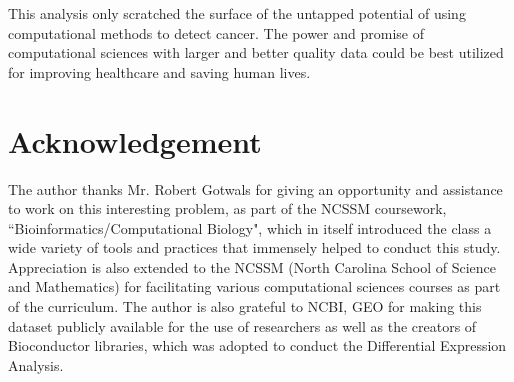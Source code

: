 \documentclass{bioinfo}
\begin{document}
This analysis only scratched the surface of the untapped potential of using computational methods to detect cancer.  The power  and  promise  of  computational  sciences  with  larger  and  better  quality  data  could  be best utilized for improving healthcare and saving human lives.




\section*{Acknowledgement}
The author thanks Mr. Robert Gotwals for giving an opportunity and assistance to work on this interesting problem, as part of the NCSSM coursework, “Bioinformatics/Computational Biology", which in itself introduced the class a wide variety of tools and practices that immensely helped to conduct this study.  Appreciation is also extended to the NCSSM (North Carolina School of Science and Mathematics) for facilitating various computational sciences courses as part of the curriculum. The author is also grateful to NCBI, GEO for making this dataset publicly available for the use of researchers as well as the creators of Bioconductor libraries, which was adopted to conduct the Differential Expression Analysis.


%
%
%
%
%
%
%
%
%
\end{document}
